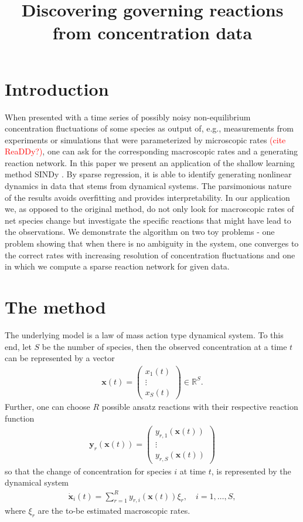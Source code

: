 \documentclass[oneside, abstracton, titlepage]{scrartcl}
\begin{document}
	\title{Discovering governing reactions from concentration data}
	\maketitle
	
	\section{Introduction}
	When presented with a time series of possibly noisy non-equilibrium concentration fluctuations of some species as output of, e.g., measurements from experiments or simulations that were parameterized by microscopic rates \textcolor{red}{(cite ReaDDy?)}, one can ask for the corresponding macroscopic rates and a generating reaction network. 
	In this paper we present an application of the shallow learning method SINDy \cite{Brunton2015}. By sparse regression, it is able to identify generating nonlinear dynamics in data that stems from dynamical systems. The parsimonious nature of the results avoids overfitting and provides interpretability.
	In our application we, as opposed to the original method, do not only look for macroscopic rates of net species change but investigate the specific reactions that might have lead to the observations.
	We demonstrate the algorithm on two toy problems - one problem showing that when there is no ambiguity in the system, one converges to the correct rates with increasing resolution of concentration fluctuations and one in which we compute a sparse reaction network for given data.
	
	\section{The method}
	The underlying model is a law of mass action type dynamical system. To this end, let $S$ be the number of species, then the observed concentration at a time $t$ can be represented by a vector
	\begin{align}
	\mathbf{x}(t)=\begin{pmatrix}
	x_1(t)\\ \vdots \\ x_S(t)
	\end{pmatrix}\in \mathbb{R}^S.
	\end{align}
	Further, one can choose $R$ possible ansatz reactions with their respective reaction function
	\begin{align}
	\textbf{y}_r(\textbf{x}(t))=\begin{pmatrix}
	y_{r,1}(\textbf{x}(t)) \\ \vdots \\ y_{r,S}(\textbf{x}(t))
	\end{pmatrix}
	\end{align}
	so that the change of concentration for species $i$ at time $t$, is represented by the dynamical system
	\begin{align}
	\dot{\textbf{x}}_i(t) = \sum_{r=1}^{R}y_{r,i}(\textbf{x}(t))\xi_r,\quad i=1,\ldots, S,
	\label{method:the-system}\end{align}
	where $\xi_r$ are the to-be estimated macroscopic rates.
	
\end{document}
